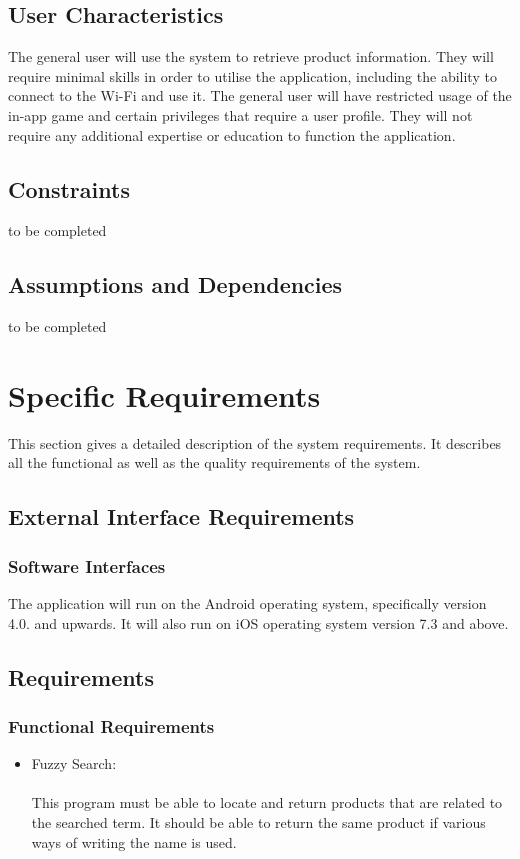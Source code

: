 \documentclass[a4paper,10pt]{article}
\begin{document}
    	\subsection{User Characteristics}  
		{ 
	
{The general user will use the system to retrieve product information. They will require minimal skills in order to utilise the application, including the ability to connect to the Wi-Fi and use it. The general user will have restricted usage of the in-app game and certain privileges that require a user profile. They will not require any additional expertise or education to function the application.\\}
    	\subsection{Constraints}   
to be completed
    	\subsection{Assumptions and Dependencies}
to be completed

	\newpage
		
	\section{Specific Requirements}
This section gives a detailed description of the system requirements. It describes all the functional as well as the quality requirements of the system.

	\subsection{External Interface Requirements}

                 \subsubsection{Software Interfaces}
The application will run on the Android operating system, specifically version 4.0. and upwards. It will also run on iOS operating system version 7.3 and above.

	\subsection{Requirements}
	\subsubsection{Functional Requirements} 
		\begin{itemize}
		\item Fuzzy Search:\\\\
			This program must be able to locate and return products that are related to the searched term. It should be able to return the same product if various ways of writing the name is used.\\\\
	

\end{itemize}}
\end{document}
